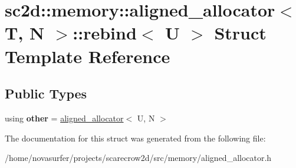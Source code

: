 \hypertarget{structsc2d_1_1memory_1_1aligned__allocator_1_1rebind}{}\section{sc2d\+:\+:memory\+:\+:aligned\+\_\+allocator$<$ T, N $>$\+:\+:rebind$<$ U $>$ Struct Template Reference}
\label{structsc2d_1_1memory_1_1aligned__allocator_1_1rebind}
\subsection*{Public Types}
\begin{DoxyCompactItemize}
\item 
\mbox{\label{structsc2d_1_1memory_1_1aligned__allocator_1_1rebind_ad4ff2139cd9fb9ab35bf39a8d7b3977a}} 
using {\bfseries other} = \hyperlink{classsc2d_1_1memory_1_1aligned__allocator}{aligned\+\_\+allocator}$<$ U, N $>$
\end{DoxyCompactItemize}


The documentation for this struct was generated from the following file\+:\begin{DoxyCompactItemize}
\item 
/home/novasurfer/projects/scarecrow2d/src/memory/aligned\+\_\+allocator.\+h\end{DoxyCompactItemize}
